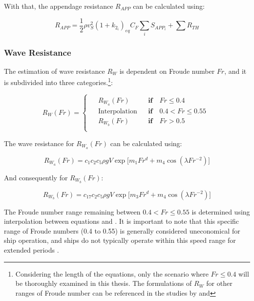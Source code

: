 With that, the appendage resistance $R_{APP}$ can be calculated using:

\begin{equation}\label{eqn:R_app}
    R_{APP} = \frac{1}{2}\rho v_S^2 (1+k_{2_i})_{eq} C_F \sum_i S_{APP_i} + \sum R_{TH}
\end{equation}

\pagebreak

\subsubsection*{Wave Resistance}

The estimation of wave resistance $R_W$ is dependent on Froude number $Fr$, and it is subdivided into three categories.\footnote{Considering the length of the equations, only the scenario where $Fr \leqslant 0.4$ will be thoroughly examined in this thesis. The formulations of $R_W$ for other ranges of Froude number can be referenced in the studies by  and }:

\begin{equation}
    \label{eqn:case_Rw}
    R_W(Fr) = 
    \begin{cases}
        \begin{aligned}
        &R_{W_a}(Fr) && \textbf{if} \quad Fr \leqslant 0.4 \\
        &\text{Interpolation} && \textbf{if} \quad 0.4 < Fr \leqslant 0.55 \\
        &R_{W_b}(Fr) && \textbf{if} \quad Fr > 0.5 \\
    \end{aligned}
    \end{cases}
\end{equation}

The wave resistance for $R_{W_a}(Fr)$ can be calculated using:

\begin{equation}\label{eqn:R_w_low}
    R_{W_a}(Fr) = c_1 c_2 c_5 \rho g V  \exp \biggl[ m_1 Fr^d + m_4 \cos(\lambda Fr ^{-2}) \biggr]
\end{equation}

And consequently for $R_{W_b}(Fr)$:

\begin{equation}\label{eqn:R_w_high}
    R_{W_b}(Fr) = c_{17} c_2 c_5 \rho g V  \exp \biggl[ m_3 Fr^d + m_4 \cos(\lambda Fr ^{-2}) \biggr]
\end{equation}

The Froude number range remaining between $0.4 < Fr \leqslant 0.55$ is determined using interpolation between equations  and . It is important to note that this specific range of Froude numbers (0.4 to 0.55) is generally considered uneconomical for ship operation, and ships do not typically operate within this speed range for extended periods .


